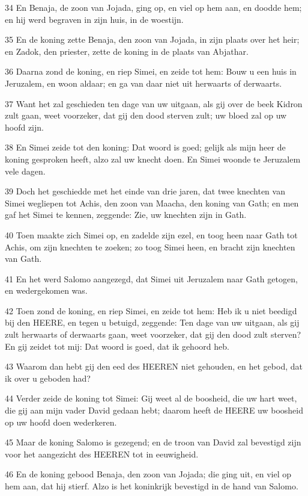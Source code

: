 \par 34 En Benaja, de zoon van Jojada, ging op, en viel op hem aan, en doodde hem; en hij werd begraven in zijn huis, in de woestijn.
\par 35 En de koning zette Benaja, den zoon van Jojada, in zijn plaats over het heir; en Zadok, den priester, zette de koning in de plaats van Abjathar.
\par 36 Daarna zond de koning, en riep Simei, en zeide tot hem: Bouw u een huis in Jeruzalem, en woon aldaar; en ga van daar niet uit herwaarts of derwaarts.
\par 37 Want het zal geschieden ten dage van uw uitgaan, als gij over de beek Kidron zult gaan, weet voorzeker, dat gij den dood sterven zult; uw bloed zal op uw hoofd zijn.
\par 38 En Simei zeide tot den koning: Dat woord is goed; gelijk als mijn heer de koning gesproken heeft, alzo zal uw knecht doen. En Simei woonde te Jeruzalem vele dagen.
\par 39 Doch het geschiedde met het einde van drie jaren, dat twee knechten van Simei wegliepen tot Achis, den zoon van Maacha, den koning van Gath; en men gaf het Simei te kennen, zeggende: Zie, uw knechten zijn in Gath.
\par 40 Toen maakte zich Simei op, en zadelde zijn ezel, en toog heen naar Gath tot Achis, om zijn knechten te zoeken; zo toog Simei heen, en bracht zijn knechten van Gath.
\par 41 En het werd Salomo aangezegd, dat Simei uit Jeruzalem naar Gath getogen, en wedergekomen was.
\par 42 Toen zond de koning, en riep Simei, en zeide tot hem: Heb ik u niet beedigd bij den HEERE, en tegen u betuigd, zeggende: Ten dage van uw uitgaan, als gij zult herwaarts of derwaarts gaan, weet voorzeker, dat gij den dood zult sterven? En gij zeidet tot mij: Dat woord is goed, dat ik gehoord heb.
\par 43 Waarom dan hebt gij den eed des HEEREN niet gehouden, en het gebod, dat ik over u geboden had?
\par 44 Verder zeide de koning tot Simei: Gij weet al de boosheid, die uw hart weet, die gij aan mijn vader David gedaan hebt; daarom heeft de HEERE uw boosheid op uw hoofd doen wederkeren.
\par 45 Maar de koning Salomo is gezegend; en de troon van David zal bevestigd zijn voor het aangezicht des HEEREN tot in eeuwigheid.
\par 46 En de koning gebood Benaja, den zoon van Jojada; die ging uit, en viel op hem aan, dat hij stierf. Alzo is het koninkrijk bevestigd in de hand van Salomo.

